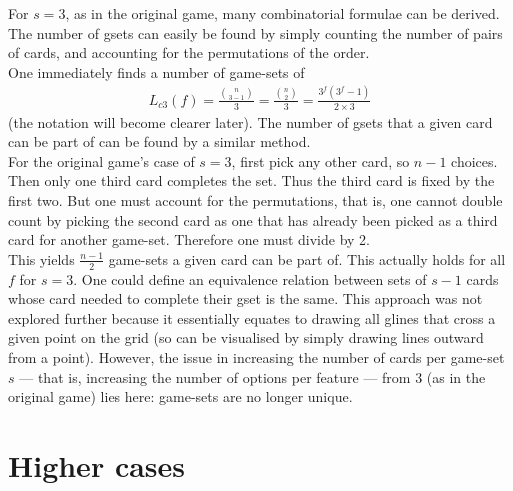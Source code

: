\documentclass{article}
\theoremstyle{definition}
\theoremstyle{remark}
\begin{document}
For $s=3$, as in the original game, many combinatorial formulae can be derived.\\
The number of gsets can easily be found by simply counting the number of pairs of cards, and accounting for the permutations of the order. \\
One immediately finds a number of game-sets of
\begin{align}
\label{eqn:gsets-3}
    L_{c3}(f)=\frac{\binom{n}{3-1}}{3}=\frac{\binom{n}{2}}{3}=\frac{3^f(3^f-1)}{2\times3}
\end{align}
(the notation will become clearer later).
\medbreak
The number of gsets that a given card can be part of can be found by a similar method.\\
For the original game's case of $s=3$, first pick any other card, so $n-1$ choices. Then only one third card completes the set. Thus the third card is fixed by the first two. 
But one must account for the permutations, that is, one cannot double count by picking the second card as one that has already been picked as a third card for another game-set. Therefore one must divide by 2. \\
This yields $\frac{n-1}{2}$ game-sets a given card can be part of. This actually holds for all $f$ for $s=3$.
\medbreak
One could define an equivalence relation between sets of $s-1$ cards whose card needed to complete their gset is the same. This approach was not explored further because it essentially equates to drawing all glines that cross a given point on the grid (so can be visualised by simply drawing lines outward from a point).
\medbreak
However, the issue in increasing the number of cards per game-set $s$ --- that is, increasing the number of options per feature --- from 3 (as in the original game) lies here: game-sets are no longer unique.

\section{Higher cases}\label{sec:high}
\end{document}
